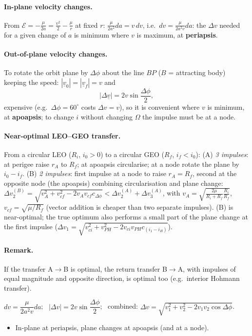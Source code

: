 \paragraph{In-plane velocity changes.} From $\mathcal E=-\frac{\mu}{2a}=\frac{v^2}{2}-\frac{\mu}{r}$ at fixed $r$: $\frac{\mu}{2a^2}da=v\,dv$, i.e.\
$dv=\frac{\mu}{2a^2v}da$: the $\Delta v$ needed for a given change of $a$ is minimum where $v$ is maximum, at \textbf{periapsis}.
\paragraph{Out-of-plane velocity changes.} To rotate the orbit plane by $\Delta\phi$ about the line $BP$ ($B$ = attracting body) keeping the speed:
$|\underline v_0|=|\underline v_f|=v$ and
\begin{equation}
|\Delta\underline v|=2v\sin\frac{\Delta\phi}{2},
\end{equation}
expensive (e.g.\ $\Delta\phi=60^\circ$ costs $\Delta v=v$), so it is convenient where $v$ is minimum, at \textbf{apoapsis}; to change $i$ without changing
$\Omega$ the impulse must be at a node.
\paragraph{Near-optimal LEO--GEO transfer.} From a circular LEO ($R_i$, $i_0>0$) to a circular GEO ($R_f$, $i_f<i_0$):
(A) \emph{3 impulses}: at perigee raise $r_A$ to $R_f$; at apoapsis circularise; at a node rotate the plane by $i_0-i_f$.
(B) \emph{2 impulses}: first impulse at a node to raise $r_A=R_f$, second at the opposite node (the apoapsis) combining circularisation and
plane change: $\Delta v_2^{(B)}=\sqrt{v_A^2+v_{cf}^2-2v_Av_{cf}c_{\Delta\phi}}<\Delta v_2^{(A)}+\Delta v_3^{(A)}$, with
$v_A=\sqrt{\frac{2\mu}{R_i+R_f}\frac{R_i}{R_f}}$, $v_{cf}=\sqrt{\mu/R_f}$ (vector addition is cheaper than two separate impulses).
(B) is near-optimal; the true optimum also performs a small part of the plane change at the first impulse
($\Delta v_1=\sqrt{v_{ci}^2+v_{PH}^2-2v_{ci}v_{PH}c_{(i_1-i_H)}}$).
\paragraph{Remark.} If the transfer A$\to$B is optimal, the return transfer B$\to$A, with impulses of equal magnitude and opposite direction, is optimal
too (e.g.\ interior Hohmann transfer).
\begin{keyf}
$dv=\dfrac{\mu}{2a^2v}da$; \ $|\Delta v|=2v\sin\dfrac{\Delta\phi}{2}$; \ combined: $\Delta v=\sqrt{v_1^2+v_2^2-2v_1v_2\cos\Delta\phi}$.
\end{keyf}
\pitfalls
\begin{itemize}
\item In-plane at periapsis, plane changes at apoapsis (and at a node).
\end{itemize}

